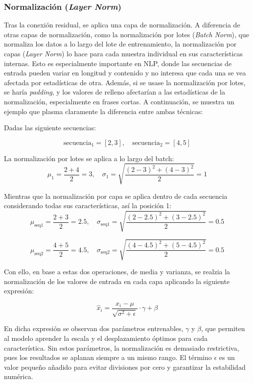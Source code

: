 \documentclass[11pt]{book}
\theoremstyle{plain}
\theoremstyle{definition}
\begin{document}
\subsubsection{Normalización (\textit{Layer Norm})}

Tras la conexión residual, se aplica una capa de normalización. A diferencia de otras capas de normalización, como la normalización por lotes (\textit{Batch Norm}), que normaliza los datos a lo largo del lote de entrenamiento, la normalización por capas (\textit{Layer Norm}) lo hace para cada muestra individual en sus características internas. Esto es especialmente importante en NLP, donde las secuencias de entrada pueden variar en longitud y contenido y no interesa que cada una se vea afectada por estadísticas de otra. Además, si se usase la normalización por lotes, se haría \textit{padding}, y los valores de relleno afectarían a las estadísticas de la normalización, especialmente en frases cortas. A continuación, se muestra un ejemplo que plasma claramente la diferencia entre ambas técnicas:

Dadas las siguiente secuencias: 

\[
\text{secuencia}_1 = [2,3], \quad \text{secuencia}_2 = [4,5]
\]

La normalización por lotes se aplica a lo largo del batch:
\[
\mu_1 = \frac{2 + 4}{2} = 3, 
\quad 
\sigma_1 = \sqrt{\frac{(2-3)^2 + (4-3)^2}{2}} = 1
\]

Mientras que la normalización por capa se aplica dentro de cada secuencia considerando todas sus características, así la posición 1:
\[
\mu_{\text{seq1}} = \frac{2 + 3}{2} = 2.5, 
\quad 
\sigma_{\text{seq1}} = \sqrt{\frac{(2-2.5)^2 + (3-2.5)^2}{2}} = 0.5
\]

\[
\mu_{\text{seq2}} = \frac{4 + 5}{2} = 4.5, 
\quad 
\sigma_{\text{seq2}} = \sqrt{\frac{(4-4.5)^2 + (5-4.5)^2}{2}} = 0.5
\]


Con ello, en base a estas dos operaciones, de media y varianza, se realzia la normalización de los valores de entrada en cada capa aplicando la siguiente expresión: 

\begin{equation}
    \hat{x}_i = \frac{x_i - \mu}{\sqrt{\sigma^2 + \epsilon}} \cdot \gamma + \beta
    \label{eq:normalization_sigma}
\end{equation}


En dicha expresión se observan dos parámetros entrenables, $\gamma$ y $\beta$, que permiten al modelo aprender la escala y el desplazamiento óptimos para cada característica. Sin estos parámetros, la normalización es demasiado restrictiva, pues los resultados se aplanan siempre a un mismo rango. El término $\epsilon$ es un valor pequeño añadido para evitar divisiones por cero y garantizar la estabilidad numérica.
\end{document}
